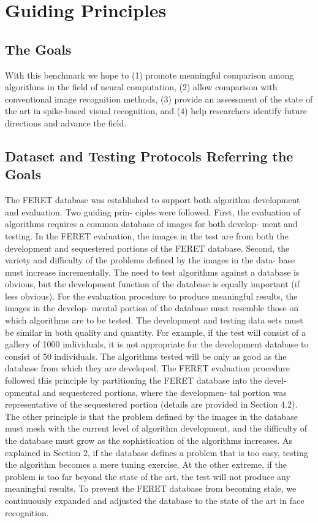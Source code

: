 \section{Guiding Principles}
\label{sec:guide}
\subsection{The Goals}
With this benchmark we hope to (1) promote meaningful comparison among algorithms in the field of neural computation, (2) allow comparison with conventional image recognition methods, (3) provide an assessment of the state of the art in spike-based visual recognition, and (4) help researchers identify future directions and advance the field.
\subsection{Dataset and Testing Protocols Referring the Goals}

The FERET database was established to support both
algorithm development and evaluation. Two guiding prin-
ciples were followed. First, the evaluation of algorithms
requires a common database of images for both develop-
ment and testing. In the FERET evaluation, the images in
the test are from both the development
and sequestered
portions of the FERET database. Second, the variety and
difficulty of the problems defined by the images in the data-
base must increase incrementally.
The need to test algorithms against a database is obvious,
but the development
function of the database is equally
important (if less obvious). For the evaluation procedure
to produce meaningful results, the images in the develop-
mental portion of the database must resemble those on
which algorithms are to be tested. The development and
testing data sets must be similar in both quality and quantity.
For example, if the test will consist of a gallery of 1000
individuals,
it is not appropriate
for the development
database to consist of 50 individuals. The algorithms tested
will be only as good as the database from which they are
developed. The FERET evaluation procedure followed this
principle by partitioning the FERET database into the devel-
opmental and sequestered portions, where the developmen-
tal portion was representative
of the sequestered portion
(details are provided in Section 4.2).
The other principle is that the problem defined by the
images in the database must mesh with the current level
of algorithm development, and the difficulty of the database
must grow as the sophistication of the algorithms increases.
As explained in Section 2, if the database defines a problem
that is too easy, testing the algorithm becomes a mere tuning
exercise. At the other extreme, if the problem is too far
beyond the state of the art, the test will not produce any
meaningful results. To prevent the FERET database from
becoming stale, we continuously expanded and adjusted the
database to the state of the art in face recognition.


